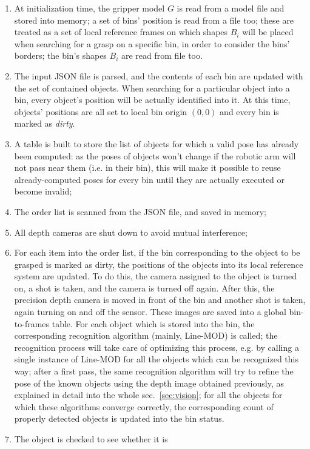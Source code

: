 \begin{enumerate}
\item{At initialization time, the gripper model $G$ is read from a
  model file and stored into memory; a set of bins' position is read
  from a file too; these are treated as a set of local reference
  frames on which shapes $B_i$ will be placed when searching for a
  grasp on a specific bin, in order to consider the bins' borders; the
  bin's shapes $B_i$ are read from file too.}
\item{The input JSON file is parsed, and the contents of each bin are
  updated with the set of contained objects. When searching for a
  particular object into a bin, every object's position will be actually
  identified into it. At this time, objects' positions are all set to
  local bin origin $(0,0)$ and every bin is marked as \emph{dirty}.}
\item{A table is built to store the list of objects for which a
  valid pose has already been computed: as the poses of objects won't
  change if the robotic arm will not pass near them (i.e. in their
  bin), this will make it possible to reuse already-computed poses for
  every bin until they are actually executed or become invalid;}
\item{The order list is scanned from the JSON file, and saved in
  memory;}
\item{All depth cameras are shut down to avoid mutual interference;}
\item{For each item into the order list, if the bin corresponding to
  the object to be grasped is marked as dirty, the positions of the
  objects into its local reference system are updated. To do this, the
  camera assigned to the object is turned on, a shot is taken, and the
  camera is turned off again. After this, the precision depth camera
  is moved in front of the bin and another shot is taken, again turning on
  and off the sensor. These images are saved into a global
  bin-to-frames table. For each object which is stored into the bin,
  the corresponding recognition algorithm (mainly, Line-MOD) is
  called; the recognition process will take care of optimizing this
  process, e.g. by calling a single instance of Line-MOD for all the
  objects which can be recognized this way; after a first pass, the
  same recognition algorithm will try to refine the pose of the known
  objects using the depth image obtained previously, as explained in
  detail into the whole sec.~\ref{sec:vision}; for all the objects for which
  these algorithms converge correctly, the corresponding count of
  properly detected objects is updated into the bin status.}
\item{The object is checked to see whether it is }
\end{enumerate}

